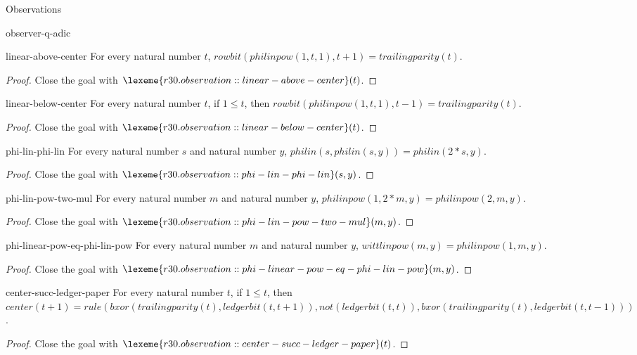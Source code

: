 \begin{lexlean}{Observations}
\begin{section}{observer-q-adic}
\begin{theorem}{linear-above-center}
For every natural number \(t\), \(rowbit(philinpow(1, t, 1), t + 1) = trailingparity(t)\).
\begin{proof}
Close the goal with \(\lexeme{r30.observation::linear-above-center}(t)\).
\end{proof}
\end{theorem}

\begin{theorem}{linear-below-center}
For every natural number \(t\), if \(1 ≤ t\), then \(rowbit(philinpow(1, t, 1), t - 1) = trailingparity(t)\).
\begin{proof}
Close the goal with \(\lexeme{r30.observation::linear-below-center}(t)\).
\end{proof}
\end{theorem}

\begin{theorem}{phi-lin-phi-lin}
For every natural number \(s\) and natural number \(y\), \(philin(s, philin(s, y)) = philin(2 * s, y)\).
\begin{proof}
Close the goal with \(\lexeme{r30.observation::phi-lin-phi-lin}(s, y)\).
\end{proof}
\end{theorem}

\begin{theorem}{phi-lin-pow-two-mul}
For every natural number \(m\) and natural number \(y\), \(philinpow(1, 2 * m, y) = philinpow(2, m, y)\).
\begin{proof}
Close the goal with \(\lexeme{r30.observation::phi-lin-pow-two-mul}(m, y)\).
\end{proof}
\end{theorem}

\begin{theorem}{phi-linear-pow-eq-phi-lin-pow}
For every natural number \(m\) and natural number \(y\), \(wittlinpow(m, y) = philinpow(1, m, y)\).
\begin{proof}
Close the goal with \(\lexeme{r30.observation::phi-linear-pow-eq-phi-lin-pow}(m, y)\).
\end{proof}
\end{theorem}

\begin{theorem}{center-succ-ledger-paper}
For every natural number \(t\), if \(1 ≤ t\), then \(center(t + 1) = rule(bxor(trailingparity(t), ledgerbit(t, t + 1)), not(ledgerbit(t, t)), bxor(trailingparity(t), ledgerbit(t, t - 1)))\).
\begin{proof}
Close the goal with \(\lexeme{r30.observation::center-succ-ledger-paper}(t)\).
\end{proof}
\end{theorem}


\end{section}
\end{lexlean}
